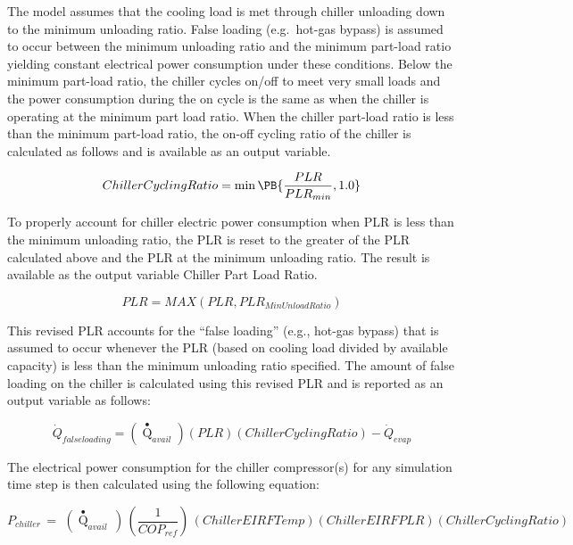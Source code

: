 The model assumes that the cooling load is met through chiller unloading down to the minimum unloading ratio. False loading (e.g.~hot-gas bypass) is assumed to occur between the minimum unloading ratio and the minimum part-load ratio yielding constant electrical power consumption under these conditions. Below the minimum part-load ratio, the chiller cycles on/off to meet very small loads and the power consumption during the on cycle is the same as when the chiller is operating at the minimum part load ratio. When the chiller part-load ratio is less than the minimum part-load ratio, the on-off cycling ratio of the chiller is calculated as follows and is available as an output variable.

\begin{equation}
  ChillerCyclingRatio = \min \PB{ \frac{PLR}{PLR_{min}}, 1.0 }
\end{equation}

To properly account for chiller electric power consumption when PLR is less than the minimum unloading ratio, the PLR is reset to the greater of the PLR calculated above and the PLR at the minimum unloading ratio. The result is available as the output variable Chiller Part Load Ratio.

\begin{equation}
PLR = MAX(PLR,PL{R_{MinUnloadRatio}})
\end{equation}

This revised PLR accounts for the ``false loading'' (e.g., hot-gas bypass) that is assumed to occur whenever the PLR (based on cooling load divided by available capacity) is less than the minimum unloading ratio specified. The amount of false loading on the chiller is calculated using this revised PLR and is reported as an output variable as follows:

\begin{equation}
{\dot{Q}_{falseloading}} = \left( {{{\mathop Q\limits^ \bullet  }_{avail}}} \right)\left( {PLR} \right)\left( {ChillerCyclingRatio} \right) - {\dot{Q}_{evap}}
\end{equation}

The electrical power consumption for the chiller compressor(s) for any simulation time step is then calculated using the following equation:

\begin{equation}
{P_{chiller}}\, = \,\,\left( {{{\mathop Q\limits^ \bullet }_{avail}}\,} \right)\,\left( {\frac{1}{{CO{P_{ref}}}}} \right)\,\left( {ChillerEIRFTemp} \right)\left( {ChillerEIRFPLR} \right)\left( {ChillerCyclingRatio} \right)
\end{equation}

